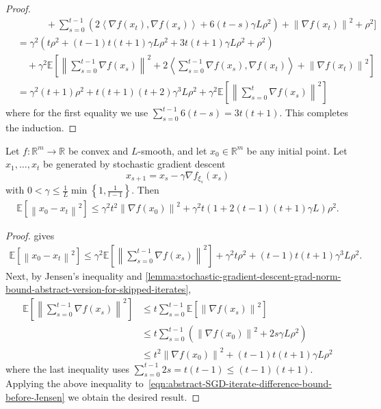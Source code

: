 \documentclass{article}
\newcommand{\reals}{\mathbb{R}}
\newcommand{\inprod}[2]{\left\langle #1,#2 \right\rangle}
\newcommand{\sqnorm}[1]{\left\| #1 \right\|^2}
\theoremstyle{plain}
\theoremstyle{remark}
\begin{document}
\begin{proof}
\begin{align*}
    & \qquad \quad + \sum_{s=0}^{t-1} \left( 2\inprod{\nabla f(x_t)}{\nabla f(x_s)} + 6(t-s) \gamma L \rho^2 \right) + \sqnorm{\nabla f(x_t)} + \rho^2 \Bigg] \\
    & = \gamma^2 \left( t \rho^2 + (t-1)t(t+1) \gamma L \rho^2 + 3t(t+1) \gamma L \rho^2 + \rho^2 \right) \\
    & \quad + \gamma^2 \mathbb{E} \left[ \sqnorm{\sum_{s=0}^{t-1} \nabla f(x_s)} + 2\inprod{\sum_{s=0}^{t-1} \nabla f(x_s)}{\nabla f(x_t)} + \sqnorm{\nabla f(x_t)} \right] \\
    & = \gamma^2 (t+1) \rho^2 + t(t+1)(t+2) \gamma^3 L \rho^2 + \gamma^2 \mathbb{E} \left[ \sqnorm{\sum_{s=0}^{t} \nabla f(x_s)} \right] 
\end{align*}
where for the first equality we use $\sum_{s=0}^{t-1} 6(t-s) = 3t(t+1)$.
This completes the induction.

\end{proof}

\begin{lemma}
\label{lemma:stochastic-gradient-descent-iterate-difference-bound-abstract-version}
Let $f \colon \reals^m \to \reals$ be convex and $L$-smooth, and let $x_0 \in \reals^m$ be any initial point.
Let $x_1,\dots,x_t$ be generated by stochastic gradient descent 
\[
    x_{s+1} = x_s - \gamma \nabla f_{\xi_s} (x_s) 
\]
with $0 < \gamma \le \frac{1}{L} \min\left\{1, \frac{1}{t-1}\right\}$.
Then
\begin{align*}
    \mathbb{E} \left[ \sqnorm{x_0 - x_t} \right] \le \gamma^2 t^2 \sqnorm{\nabla f(x_0)} + \gamma^2 t (1 + 2(t-1)(t+1) \gamma L) \rho^2 .
\end{align*}
\end{lemma}

\begin{proof}
 gives
\begin{align}
\label{eqn:abstract-SGD-iterate-difference-bound-before-Jensen}
    \mathbb{E} \left[ \sqnorm{x_0 - x_t} \right] \le \gamma^2 \mathbb{E} \left[ \sqnorm{\sum_{s=0}^{t-1} \nabla f(x_s)} \right] + \gamma^2 t \rho^2 + (t-1)t(t+1) \gamma^3 L \rho^2 .
\end{align}
Next, by Jensen's inequality and \cref{lemma:stochastic-gradient-descent-grad-norm-bound-abstract-version-for-skipped-iterates},
\begin{align*}
    \mathbb{E} \left[ \sqnorm{\sum_{s=0}^{t-1} \nabla f(x_s)} \right] & \le t \sum_{s=0}^{t-1} \mathbb{E} \left[ \sqnorm{\nabla f(x_s)} \right] \\
    & \le t \sum_{s=0}^{t-1} \left( \sqnorm{\nabla f(x_0)} + 2s \gamma L \rho^2 \right) \\
    & \le t^2 \sqnorm{\nabla f(x_0)} + (t-1)t(t+1) \gamma L \rho^2
\end{align*}
where the last inequality uses $\sum_{s=0}^{t-1} 2s = t(t-1) \le (t-1)(t+1)$.
Applying the above inequality to~\eqref{eqn:abstract-SGD-iterate-difference-bound-before-Jensen} we obtain the desired result.
\end{proof}
\end{document}
